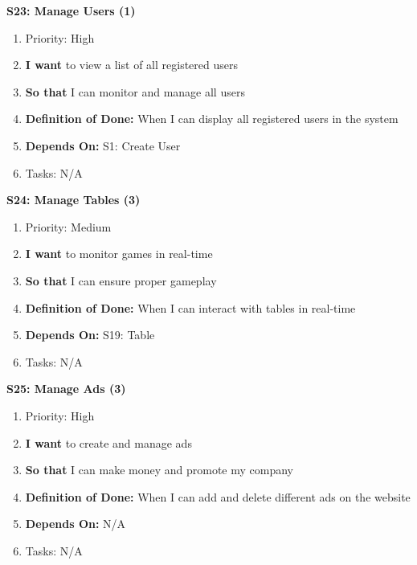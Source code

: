 \textbf{S23: Manage Users (1)}
\begin{enumerate}
    \item Priority: High
    \item \textbf{I want} to view a list of all registered users
    \item \textbf{So that} I can monitor and manage all users
    \item \textbf{Definition of Done:} When I can display all registered users in the system
    \item \textbf{Depends On:} S1: Create User
    \item Tasks: N/A
\end{enumerate}


\textbf{S24: Manage Tables (3)}
\begin{enumerate}
    \item Priority: Medium
    \item \textbf{I want} to monitor games in real-time
    \item \textbf{So that} I can ensure proper gameplay
    \item \textbf{Definition of Done:} When I can interact with tables in real-time
    \item \textbf{Depends On:} S19: Table
    \item Tasks: N/A
\end{enumerate}


\textbf{S25: Manage Ads (3)}
\begin{enumerate}
    \item Priority: High
    \item \textbf{I want} to create and manage ads
    \item \textbf{So that} I can make money and promote my company
    \item \textbf{Definition of Done:} When I can add and delete different ads on the website
    \item \textbf{Depends On:} N/A
    \item Tasks: N/A
\end{enumerate}


